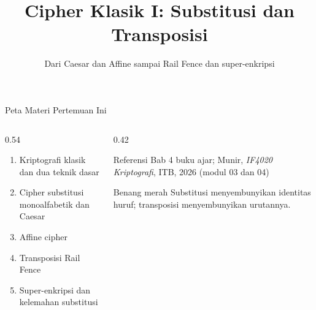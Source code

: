 \documentclass[aspectratio=169,11pt]{beamer}
\title{Cipher Klasik I: Substitusi dan Transposisi}
\subtitle{Dari Caesar dan Affine sampai Rail Fence dan super-enkripsi}
\begin{document}
\begin{frame}[plain]
    \titlepage
\end{frame}

\begin{frame}{Peta Materi Pertemuan Ini}
    \begin{columns}[T,onlytextwidth]
        \begin{column}{0.54\textwidth}
            \begin{enumerate}
                \item Kriptografi klasik dan dua teknik dasar
                \item Cipher substitusi monoalfabetik dan Caesar
                \item Affine cipher
                \item Transposisi Rail Fence
                \item Super-enkripsi dan kelemahan substitusi
            \end{enumerate}
        \end{column}
        \begin{column}{0.42\textwidth}
            \begin{block}{Referensi}
                \footnotesize
                Bab 4 buku ajar; Munir, \textit{IF4020 Kriptografi},
                ITB, 2026 (modul 03 dan 04)
            \end{block}
            \begin{exampleblock}{Benang merah}
                \footnotesize
                Substitusi menyembunyikan identitas huruf; transposisi
                menyembunyikan urutannya.
            \end{exampleblock}
        \end{column}
    \end{columns}
\end{frame}
\end{document}
